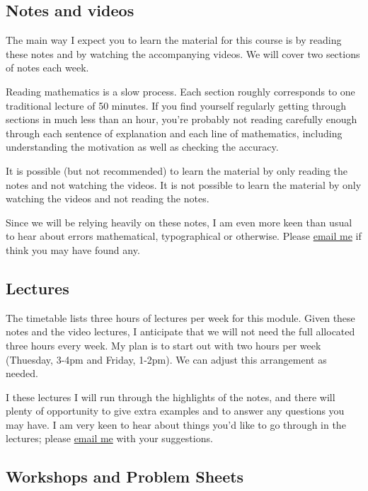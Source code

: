 \documentclass[
  a4paper,
]{article}
\theoremstyle{definition}
\theoremstyle{definition}
\theoremstyle{definition}
\theoremstyle{definition}
\theoremstyle{remark}
\begin{document}
\hypertarget{notes}{%
\subsection*{Notes and videos}\label{notes}}

The main way I expect you to learn the material for this course is by
reading these notes and by watching the accompanying videos. We will
cover two sections of notes each week.

Reading mathematics is a slow process. Each section roughly
corresponds to one traditional lecture of 50
minutes. If you find yourself regularly getting through sections in
much less than an hour, you're probably not reading carefully enough
through each sentence of explanation and each line of mathematics,
including understanding the motivation as well as checking the
accuracy.

It is possible (but not recommended) to learn the material by only
reading the notes and not watching the videos. It is not possible to
learn the material by only watching the videos and not reading the
notes.

Since we will be relying heavily on these notes, I am even more
keen than usual to hear about errors mathematical, typographical or
otherwise. Please \href{mailto:J.Voss@leeds.ac.uk}{email me} if
think you may have found any.

\hypertarget{lectures}{%
\subsection*{Lectures}\label{lectures}}

The timetable lists three hours of lectures per week for this module.
Given these notes and the video lectures, I anticipate that we will not
need the full allocated three hours every week. My plan is to start out
with two hours per week (Thuesday, 3-4pm and Friday, 1-2pm). We can
adjust this arrangement as needed.

I these lectures I will run through the highlights of the notes,
and there will plenty of opportunity to give extra examples and to answer
any questions you may have.
I am very keen to hear about things you'd like to go through in the
lectures; please \href{mailto:J.Voss@leeds.ac.uk}{email me} with your
suggestions.

\hypertarget{workshops}{%
\subsection*{Workshops and Problem Sheets}\label{workshops}}
\end{document}
